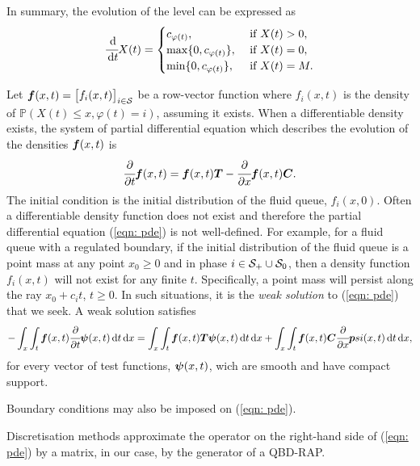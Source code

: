 In summary, the evolution of the level can be expressed as 
\[\cfrac{\, \mathrm{d}}{\, \mathrm{d} t} X(t) = \begin{cases} c_{\varphi(t)}, & \mbox{ if } X(t)>0, \\ \max\{0,c_{\varphi(t)}\}, & \mbox{ if } X(t)=0, \\ \min\{0,c_{\varphi(t)}\}, & \mbox{ if } X(t)=M.  \end{cases}\]

Let \(\boldsymbol f(x,t) = \begin{bmatrix} f_i(x,t) \end{bmatrix}_{i\in\mathcal{S}}\) be a row-vector function where \(f_i(x,t)\) is the density of \(\mathbb P(X(t)\leq x, \varphi(t) = i)\), assuming it exists. When a differentiable density exists, the system of partial differential equation which describes the evolution of the densities \(\boldsymbol f(x,t)\) is 
\begin{equation}
	\cfrac{\partial}{\partial t} \boldsymbol f(x,t) = \boldsymbol f(x,t)\boldsymbol T - \cfrac{\partial}{\partial x}\boldsymbol f(x,t)\boldsymbol C.\label{eqn: pde}
\end{equation}
The initial condition is the initial distribution of the fluid queue, \(f_i(x,0)\). Often a differentiable density function does not exist and therefore the partial differential equation (\ref{eqn: pde}) is not well-defined. For example, for a fluid queue with a regulated boundary, if the initial distribution of the fluid queue is a point mass at any point \(x_0\geq 0\) and in phase \(i\in\mathcal{S}_+\cup\mathcal{S}_0\), then a density function \(f_i(x,t)\) will not exist for any finite \(t\). Specifically, a point mass will persist along the ray \(x_0+c_it\), \(t\geq 0\). In such situations, it is the \emph{weak solution} to (\ref{eqn: pde}) that we seek. A weak solution satisfies
\begin{equation}
	-\int_x\int_t \boldsymbol f(x,t)\cfrac{\partial}{\partial t} \boldsymbol \psi(x,t)\, \mathrm{d} t \, \mathrm{d} x= \int_{x}\int_t\boldsymbol f(x,t)\boldsymbol T\boldsymbol \psi(x,t)\, \mathrm{d} t \, \mathrm{d} x + \int_x\int_t\boldsymbol f(x,t)\boldsymbol C \cfrac{\partial}{\partial x} \boldsymbol psi(x,t)\, \mathrm{d} t \, \mathrm{d} x,\label{eqn: weak pde}
\end{equation}
for every vector of test functions, \(\boldsymbol \psi(x,t)\), wich are smooth and have compact support.

Boundary conditions may also be imposed on (\ref{eqn: pde}). 

Discretisation methods approximate the operator on the right-hand side of (\ref{eqn: pde}) by a matrix, in our case, by the generator of a QBD-RAP. 

